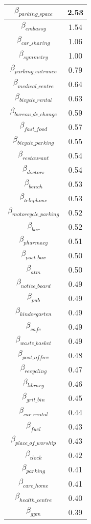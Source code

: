 \begin{tabular}{c|c}
$\beta_{parking\_space}$ & 2.53 \\
\hline
$\beta_{embassy}$ & 1.54 \\
$\beta_{car\_sharing}$ & 1.06 \\
$\beta_{symmetry}$ & 1.00 \\
$\beta_{parking\_entrance}$ & 0.79 \\
$\beta_{medical\_centre}$ & 0.64 \\
$\beta_{bicycle\_rental}$ & 0.63 \\
$\beta_{bureau\_de\_change}$ & 0.59 \\
$\beta_{fast\_food}$ & 0.57 \\
$\beta_{bicycle\_parking}$ & 0.55 \\
$\beta_{restaurant}$ & 0.54 \\
$\beta_{doctors}$ & 0.54 \\
$\beta_{bench}$ & 0.53 \\
$\beta_{telephone}$ & 0.53 \\
$\beta_{motorcycle\_parking}$ & 0.52 \\
$\beta_{bar}$ & 0.52 \\
$\beta_{pharmacy}$ & 0.51 \\
$\beta_{post\_box}$ & 0.50 \\
$\beta_{atm}$ & 0.50 \\
$\beta_{notice\_board}$ & 0.49 \\
$\beta_{pub}$ & 0.49 \\
$\beta_{kindergarten}$ & 0.49 \\
$\beta_{cafe}$ & 0.49 \\
$\beta_{waste\_basket}$ & 0.49 \\
$\beta_{post\_office}$ & 0.48 \\
$\beta_{recycling}$ & 0.47 \\
$\beta_{library}$ & 0.46 \\
$\beta_{grit\_bin}$ & 0.45 \\
$\beta_{car\_rental}$ & 0.44 \\
$\beta_{fuel}$ & 0.43 \\
$\beta_{place\_of\_worship}$ & 0.43 \\
$\beta_{clock}$ & 0.42 \\
$\beta_{parking}$ & 0.41 \\
$\beta_{care\_home}$ & 0.41 \\
$\beta_{health\_centre}$ & 0.40 \\
$\beta_{gym}$ & 0.39 \\

\end{tabular}
